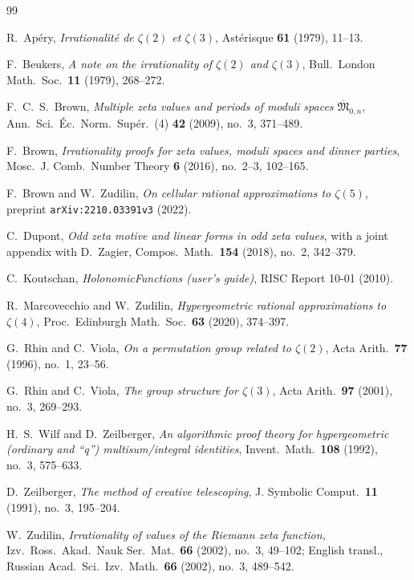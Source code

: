 \documentclass[11pt,reqno]{amsart}
\theoremstyle{plain}
\theoremstyle{definition}
\theoremstyle{remark}
\numberwithin{equation}{section}
\begin{document}
\begin{thebibliography}{99}

R.~Ap\'ery, \emph{Irrationalit\'e de $\zeta(2)$ et $\zeta(3)$}, Ast\'erisque \textbf{61} (1979),
11--13.

F.~Beukers, \emph{A note on the irrationality of $\zeta(2)$ and $\zeta(3)$}, Bull.\ London Math.\
Soc.\ \textbf{11} (1979), 268--272.

F.~C.~S.~Brown, \emph{Multiple zeta values and periods of moduli spaces
$\overline{\mathfrak M}_{0,n}$}, Ann.\ Sci.\ \'Ec.\ Norm.\ Sup\'er.\ (4) \textbf{42} (2009),
no.~3, 371--489.

F.~Brown, \emph{Irrationality proofs for zeta values, moduli spaces and dinner parties}, Mosc.\
J. Comb.\ Number Theory \textbf{6} (2016), no.~2--3, 102--165.

F.~Brown and W.~Zudilin, \emph{On cellular rational approximations to $\zeta(5)$}, preprint
\texttt{arXiv:2210.03391v3} (2022).

C.~Dupont, \emph{Odd zeta motive and linear forms in odd zeta values}, with a joint appendix
with D.~Zagier, Compos.\ Math.\ \textbf{154} (2018), no.~2, 342--379.

\bibitem[Ko10]{Ko10}
C.~Koutschan, \emph{HolonomicFunctions (user's guide)}, RISC Report 10-01 (2010).

\bibitem[MZ20]{MZ20}
R.~Marcovecchio and W.~Zudilin, \emph{Hypergeometric rational approximations to $\zeta(4)$},
Proc.\ Edinburgh Math.\ Soc.\ \textbf{63} (2020), 374--397.

G.~Rhin and C.~Viola, \emph{On a permutation group related to $\zeta(2)$}, Acta Arith.\
\textbf{77} (1996), no.~1, 23--56.

\bibitem[RV01]{RV01}
G.~Rhin and C.~Viola, \emph{The group structure for $\zeta(3)$}, Acta Arith.\ \textbf{97}
(2001), no.~3, 269--293.

\bibitem[WZ92]{WZ92}
H.~S.~Wilf and D.~Zeilberger, \emph{An algorithmic proof theory for hypergeometric (ordinary and
``q'') multisum/integral identities}, Invent.\ Math.\ \textbf{108} (1992), no.~3, 575--633.

\bibitem[Ze91]{Zei91}
D.~Zeilberger, \emph{The method of creative telescoping}, J. Symbolic Comput.\ \textbf{11}
(1991), no.~3, 195--204.

\bibitem[Zu02]{Zu02a}
W.~Zudilin, \emph{Irrationality of values of the Riemann zeta function}, Izv.\ Ross.\ Akad.\
Nauk Ser.\ Mat.\ \textbf{66} (2002), no.~3, 49--102; English transl., Russian Acad.\ Sci.\ Izv.\
Math.\ \textbf{66} (2002), no.~3, 489--542.


\end{thebibliography}
\end{document}
